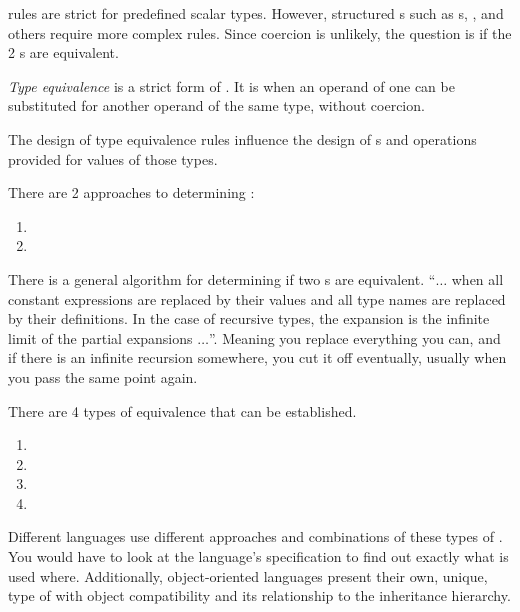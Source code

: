  rules are strict for predefined scalar types.
However, structured s such as s, , and others require more complex rules.
Since  coercion is unlikely, the question is if the 2 s are equivalent.

\begin{definition}\label{def:Type_Equivalence}
  \emph{Type equivalence} is a strict form of .
  It is when an operand of one  can be substituted for another operand of the same type, without  coercion.

  The design of type equivalence rules influence the design of s and operations provided for values of those types.

  There are 2 approaches to determining :
  \begin{enumerate}[noitemsep]
  \item {}
  \item {}
  \end{enumerate}

  There is a general algorithm for determining if two s are equivalent.
  ``$\ldots$ when all constant expressions are replaced by their values and all type names are replaced by their definitions.
  In the case of recursive types, the expansion is the infinite limit of the partial expansions $\ldots$''.
  Meaning you replace everything you can, and if there is an infinite recursion somewhere, you cut it off eventually, usually when you pass the same point again.

  There are 4 types of equivalence that can be established.
  \begin{enumerate}[noitemsep]
  \item {}
  \item {}
  \item {}
  \item {}
  \end{enumerate}
\end{definition}

Different languages use different approaches and combinations of these types of .
You would have to look at the language's specification to find out exactly what is used where.
Additionally, object-oriented languages present their own, unique, type of  with object compatibility and its relationship to the inheritance hierarchy.

